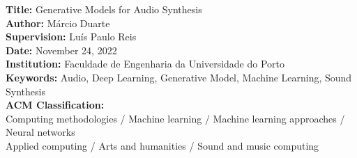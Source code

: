 \documentclass[11pt,a4paper]{article}
\newcommand{\titles}[2]{\noindent\textbf{#1:} #2\\[2mm]}
\begin{document}
\titles{Title}{Generative Models for Audio Synthesis}
\titles{Author}{Márcio Duarte}
\titles{Supervision}{Luís Paulo Reis}
\titles{Date}{November 24, 2022}
\titles{Institution}{Faculdade de Engenharia da Universidade do Porto}



\titles{Keywords}{Audio, Deep Learning, Generative Model, Machine Learning, Sound Synthesis}
\titles{ACM Classification}{\\Computing methodologies / Machine learning / Machine learning approaches / Neural networks \\ Applied computing / Arts and humanities / Sound and music computing}

\nocite{*}  %



\end{document}
